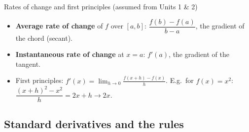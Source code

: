 \begin{keyres}{Rates of change and first principles (assumed from Units 1 \& 2)}
\begin{itemize}
  \item \textbf{Average rate of change} of $f$ over $[a,b]$: $\dfrac{f(b)-f(a)}{b-a}$, the gradient of the chord (secant).
  \item \textbf{Instantaneous rate of change} at $x=a$: $f'(a)$, the gradient of the tangent.
  \item First principles: $f'(x)=\displaystyle\lim_{h\to0}\frac{f(x+h)-f(x)}{h}$. E.g.\ for $f(x)=x^2$: $\dfrac{(x+h)^2-x^2}{h}=2x+h\to2x$.
\end{itemize}
\end{keyres}

\subsection{Standard derivatives and the rules}
\label{sec:rules}


